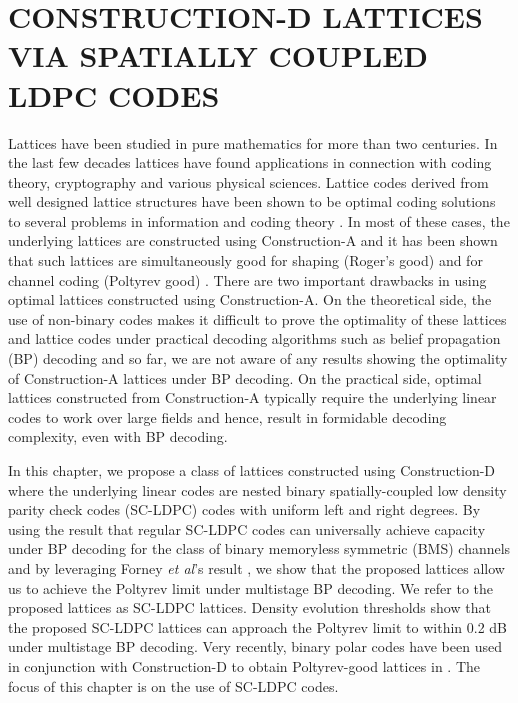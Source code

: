 %
%
%
%

\def \figures_path{./data/SCLDPC}
\chapter{\uppercase {Construction-D Lattices via Spatially coupled LDPC codes}}
\label{chap:SCLDPClattices}
Lattices have been studied in pure mathematics for more than two centuries. In the last few decades lattices have found applications in connection with coding theory, cryptography and various physical sciences. Lattice codes derived from well designed lattice structures have been shown to be optimal coding solutions to several problems in information and coding theory \cite{erez05,zamir2014lattice}. In most of these cases, the underlying lattices are constructed using Construction-A and it has been shown that such lattices are simultaneously good for shaping (Roger's good) and for channel coding (Poltyrev good) \cite{erez05}. There are two important drawbacks in using optimal lattices constructed using Construction-A. On the theoretical side, the use of non-binary codes makes it difficult to prove the optimality of these lattices and lattice codes under practical decoding algorithms such as belief propagation (BP) decoding and so far, we are not aware of any results showing the optimality of Construction-A lattices under BP decoding. On the practical side, optimal lattices constructed from Construction-A typically require the underlying linear codes to work over large fields and hence, result in formidable decoding complexity, even with BP decoding.

In this chapter, we propose a class of lattices constructed using Construction-D \cite{BarnesSloane83} where the underlying linear codes are nested binary spatially-coupled low density parity check codes (SC-LDPC) codes with uniform left and right degrees. By using the result that regular SC-LDPC codes can universally achieve capacity under BP decoding for the class of binary memoryless symmetric (BMS) channels  \cite{kudekaruniversal,kumar2014threshold} and by leveraging Forney {\em et al}'s result \cite{forney2000}, we show that the proposed lattices allow us to achieve the Poltyrev limit under multistage BP decoding. We refer to the proposed lattices as SC-LDPC lattices. Density evolution thresholds show that the proposed SC-LDPC lattices can approach the Poltyrev limit to within 0.2 dB under multistage BP decoding. Very recently, binary polar codes have been used in conjunction with Construction-D to obtain Poltyrev-good lattices in \cite{YanLingWu13}. The focus of this chapter is on the use of SC-LDPC codes.

